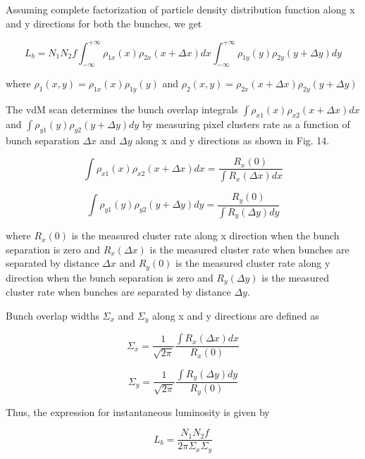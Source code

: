 Assuming complete factorization of particle density distribution function along x and y directions for both the bunches, we get 

\begin{equation}
L_{b} = N_1 N_2 f \int^{+\infty}_{-\infty} \rho_{1x}(x) \rho_{2x}(x+\Delta x)  dx   \int^{+\infty}_{-\infty} \rho_{1y}(y) \rho_{2y}(y+\Delta y)  dy 
\end{equation}

where $\rho_1(x,y) = \rho_{1x}(x) \rho_{1y} (y)$ and $\rho_2(x,y) = \rho_{2x}(x+\Delta x) \rho_{2y} (y+\Delta y)$ 

The vdM scan determines the bunch  overlap integrals $\int \rho_{x1} (x) \rho_{x2} (x+\Delta x) dx$ and  $\int \rho_{y1}(y) \rho_{y2} (y+\Delta y) dy$ by measuring pixel clusters rate as a function of bunch separation $\Delta x$ and $\Delta y$ along x and y directions as shown in Fig. 14. 

\begin{equation}
\int \rho_{x1} (x) \rho_{x2} (x+\Delta x) dx = \frac{R_x(0)}{\int R_x(\Delta x)dx} 
\end{equation}

\begin{equation}
\int \rho_{y1} (y) \rho_{y2} (y+\Delta y) dy = \frac{R_y(0)}{\int R_y(\Delta y)dy} 
\end{equation}

where $R_x(0)$ is the measured cluster rate along x direction when the bunch separation is zero and $R_x(\Delta x)$ is the measured cluster rate when bunches are separated by distance $\Delta x$ and $R_y(0)$ is the measured cluster rate along y direction when the bunch separation is zero and $R_y(\Delta y)$ is the measured cluster rate when bunches are separated by distance $\Delta y$. 

Bunch overlap widths $\Sigma_x$ and $\Sigma_y$ along x and y directions are defined as 

\begin{equation}
\Sigma_x = \frac{1}{\sqrt{2 \pi}} \frac{\int R_x(\Delta x)dx}{R_x(0)} 
\end{equation}

\begin{equation}
\Sigma_y =  \frac{1}{\sqrt{2 \pi}} \frac{\int R_y(\Delta y)dy}{R_y(0)} 
\end{equation}

Thus, the expression for instantaneous luminosity is given by 

\begin{equation}
L_{b} = \frac{N_1 N_2 f}{2\pi \Sigma_x \Sigma_y}
\end{equation}

